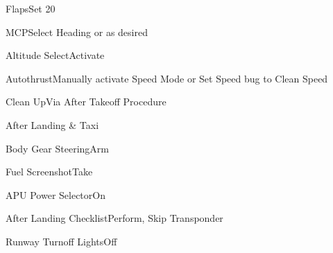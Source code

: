 \documentclass[sim-use, blue_items]{checklist}
\begin{document}
\begin{continuedchecklist}
	\item{Flaps}{Set 20}
	\item{MCP}{Select Heading or as desired}
	\item{Altitude Select}{Activate}
	\item{Autothrust}{Manually activate Speed Mode or Set Speed bug to Clean Speed}
	\item{Clean Up}{Via After Takeoff Procedure}
\end{continuedchecklist}

\begin{checklist}{After Landing \& Taxi}
	\item{Body Gear Steering}{Arm}
	\item{Fuel Screenshot}{Take}
	\item{APU Power Selector}{On}
	\item{After Landing Checklist}{Perform, Skip Transponder}
	 {
		\item{Runway Turnoff Lights}{Off}
	}
\end{checklist}
\end{document}
